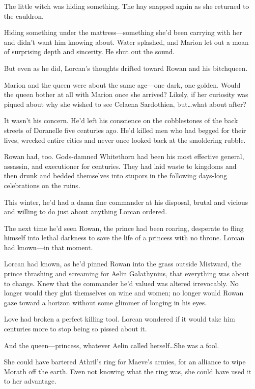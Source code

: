 The little witch was hiding something.
The hay snapped again as she returned to the cauldron.

Hiding something under the mattress---something she'd been carrying with her and didn't want him knowing about.
Water splashed, and Marion let out a moan of surprising depth and sincerity.
He shut out the sound.

But even as he did, Lorcan's thoughts drifted toward Rowan and his bitchqueen.

Marion and the queen were about the same age---one dark, one golden.
Would the queen bother at all with Marion once she arrived?
Likely, if her curiosity was piqued about why she wished to see Celaena Sardothien, but\ldots what about after?

It wasn't his concern.
He'd left his conscience on the cobblestones of the back streets of Doranelle five centuries ago.
He'd killed men who had begged for their lives, wrecked entire cities and never once looked back at the smoldering rubble.

Rowan had, too.
Gods-damned Whitethorn had been his most effective general, assassin, and executioner for centuries.
They had laid waste to kingdoms and then drunk and bedded themselves into stupors in the following days-long celebrations on the ruins.

This winter, he'd had a damn fine commander at his disposal, brutal and vicious and willing to do just about anything Lorcan ordered.

The next time he'd seen Rowan, the prince had been roaring, desperate to fling himself into lethal darkness to save the life of a princess with no throne.
Lorcan had known---in that moment.

Lorcan had known, as he'd pinned Rowan into the grass outside Mistward, the prince thrashing and screaming for Aelin Galathynius, that everything was about to change.
Knew that the commander he'd valued was altered irrevocably.
No longer would they glut themselves on wine and women; no longer would Rowan gaze toward a horizon without some glimmer of longing in his eyes.

Love had broken a perfect killing tool.
Lorcan wondered if it would take him centuries more to stop being so pissed about it.

And the queen---princess, whatever Aelin called herself\ldots She was a fool.

She could have bartered Athril's ring for Maeve's armies, for an alliance to wipe Morath off the earth.
Even not knowing what the ring was, she could have used it to her advantage.

